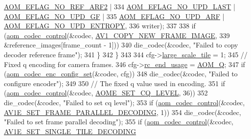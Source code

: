 \begin{DoxyCodeInclude}
{{{{{{{      \hyperlink{group__aom__encoder_gad04799a74215e1b9609f7ccd1766f8c9}{AOM\_EFLAG\_NO\_REF\_ARF2} |
334                        \hyperlink{group__aom__encoder_ga7a55a46970c074b761319c5c46d87b6e}{AOM\_EFLAG\_NO\_UPD\_LAST} | 
      \hyperlink{group__aom__encoder_gaa81cc31f95fd463f51a158050d267a36}{AOM\_EFLAG\_NO\_UPD\_GF} |
335                        \hyperlink{group__aom__encoder_ga469b4cf5ff76cb30de951e129c25a786}{AOM\_EFLAG\_NO\_UPD\_ARF} | 
      \hyperlink{group__aom__encoder_gac5a69f04b0bc88f755587a1da815d754}{AOM\_EFLAG\_NO\_UPD\_ENTROPY},
336                    writer);
337 
338       \textcolor{keywordflow}{if} (\hyperlink{group__codec_ga6da974f4eeaba1fa74106b28d0fe6ac5}{aom\_codec\_control}(&codec, \hyperlink{group__aom_gga9421a1fa78c0d9587ae5aa6c1cb3d659ae41763622ee33cd99e23ca8f78a3f8fa}{AV1\_COPY\_NEW\_FRAME\_IMAGE},
339                             &reference\_images[frame\_count - 1]))
340         die\_codec(&codec, \textcolor{stringliteral}{"Failed to copy decoder reference frame"});
341     \}
342   \}
343 
344   cfg->\hyperlink{structaom__codec__enc__cfg_af4583da6c145778f822a4a61db28c40a}{large\_scale\_tile} = 1;
345   \textcolor{comment}{// Fixed q encoding for camera frames.}
346   cfg->\hyperlink{structaom__codec__enc__cfg_a3fd74d888658039d09bc4eacf163a495}{rc\_end\_usage} = \hyperlink{group__encoder_gga7c084d3ecef569aad166ce70b0e8a957aff3bbd4fe870b4b946c2093e59eb14e5}{AOM\_Q};
347   \textcolor{keywordflow}{if} (\hyperlink{group__encoder_gaf4a4c3c3c91dd92c960990f6e534271d}{aom\_codec\_enc\_config\_set}(&codec, cfg))
348     die\_codec(&codec, \textcolor{stringliteral}{"Failed to configure encoder"});
349 
350   \textcolor{comment}{// The fixed q value used in encoding.}
351   \textcolor{keywordflow}{if} (\hyperlink{group__codec_ga6da974f4eeaba1fa74106b28d0fe6ac5}{aom\_codec\_control}(&codec, \hyperlink{group__aom__encoder_ggae78dde67a6d78f332e9bdba0dde42db5af67f265bf63bf8f1268b3a14ae26606c}{AOME\_SET\_CQ\_LEVEL}, 36))
352     die\_codec(&codec, \textcolor{stringliteral}{"Failed to set cq level"});
353   \textcolor{keywordflow}{if} (\hyperlink{group__codec_ga6da974f4eeaba1fa74106b28d0fe6ac5}{aom\_codec\_control}(&codec, 
      \hyperlink{group__aom__encoder_ggae78dde67a6d78f332e9bdba0dde42db5a465382b6bbca24467739c3c1b94e6483}{AV1E\_SET\_FRAME\_PARALLEL\_DECODING}, 1))
354     die\_codec(&codec, \textcolor{stringliteral}{"Failed to set frame parallel decoding"});
355   \textcolor{keywordflow}{if} (\hyperlink{group__codec_ga6da974f4eeaba1fa74106b28d0fe6ac5}{aom\_codec\_control}(&codec, \hyperlink{group__aom__encoder_ggae78dde67a6d78f332e9bdba0dde42db5af341538631ffe2ac2b562c8b5336a10a}{AV1E\_SET\_SINGLE\_TILE\_DECODING}
}}}}}}}
\end{DoxyCodeInclude}
